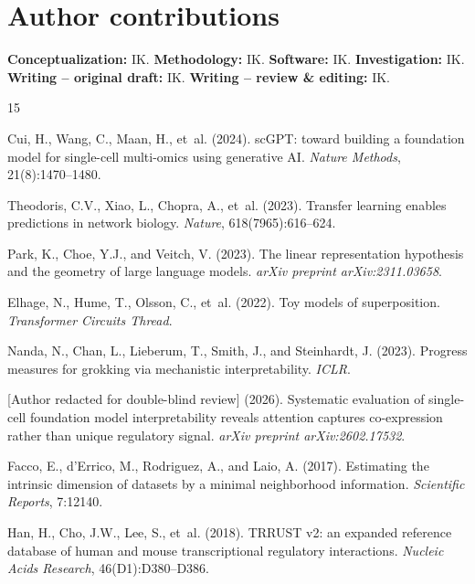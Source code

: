 \documentclass[12pt]{article}
\begin{document}
\section*{Author contributions}
\textbf{Conceptualization:} IK.
\textbf{Methodology:} IK.
\textbf{Software:} IK.
\textbf{Investigation:} IK.
\textbf{Writing -- original draft:} IK.
\textbf{Writing -- review \& editing:} IK.

\begin{thebibliography}{15}

Cui, H., Wang, C., Maan, H., et~al. (2024).
scGPT: toward building a foundation model for single-cell multi-omics using generative AI.
\textit{Nature Methods}, 21(8):1470--1480.

Theodoris, C.V., Xiao, L., Chopra, A., et~al. (2023).
Transfer learning enables predictions in network biology.
\textit{Nature}, 618(7965):616--624.

Park, K., Choe, Y.J., and Veitch, V. (2023).
The linear representation hypothesis and the geometry of large language models.
\textit{arXiv preprint arXiv:2311.03658}.

Elhage, N., Hume, T., Olsson, C., et~al. (2022).
Toy models of superposition.
\textit{Transformer Circuits Thread}.

Nanda, N., Chan, L., Lieberum, T., Smith, J., and Steinhardt, J. (2023).
Progress measures for grokking via mechanistic interpretability.
\textit{ICLR}.

[Author redacted for double-blind review] (2026).
Systematic evaluation of single-cell foundation model interpretability reveals attention captures co-expression rather than unique regulatory signal.
\textit{arXiv preprint arXiv:2602.17532}.

Facco, E., d'Errico, M., Rodriguez, A., and Laio, A. (2017).
Estimating the intrinsic dimension of datasets by a minimal neighborhood information.
\textit{Scientific Reports}, 7:12140.

Han, H., Cho, J.W., Lee, S., et~al. (2018).
TRRUST v2: an expanded reference database of human and mouse transcriptional regulatory interactions.
\textit{Nucleic Acids Research}, 46(D1):D380--D386.


\end{thebibliography}
\end{document}

